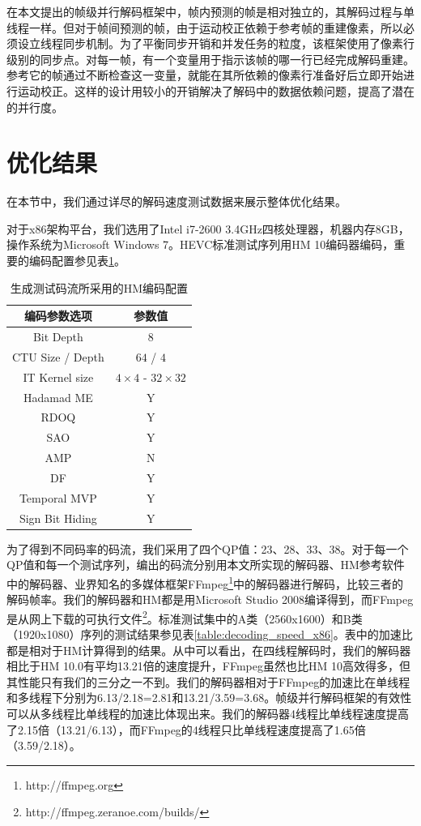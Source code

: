 在本文提出的帧级并行解码框架中，帧内预测的帧是相对独立的，其解码过程与单线程一样。但对于帧间预测的帧，由于运动校正依赖于参考帧的重建像素，所以必须设立线程同步机制。为了平衡同步开销和并发任务的粒度，该框架使用了像素行级别的同步点。对每一帧，有一个变量用于指示该帧的哪一行已经完成解码重建。参考它的帧通过不断检查这一变量，就能在其所依赖的像素行准备好后立即开始进行运动校正。这样的设计用较小的开销解决了解码中的数据依赖问题，提高了潜在的并行度。

\section{优化结果}

在本节中，我们通过详尽的解码速度测试数据来展示整体优化结果。

对于x86架构平台，我们选用了Intel i7-2600 3.4GHz四核处理器，机器内存8GB，操作系统为Microsoft Windows 7。HEVC标准测试序列用HM 10编码器编码，重要的编码配置参见表\ref{table:HM_config}。

\begin{table}[t]
	\begin{center}
		\caption{生成测试码流所采用的HM编码配置} \label{table:HM_config}
		\renewcommand{\arraystretch}{1.5}
		\begin{tabular}{c|c}
			\hline
			\textbf{编码参数选项} & \textbf{参数值} \\
			\hline
			\hline
			Bit Depth & $8$ \\
			\hline
			CTU Size / Depth & $64$ / $4$ \\
			\hline
			IT Kernel size & $4 \times 4$ - $32 \times 32$ \\
			\hline
			Hadamad ME & Y \\
			\hline
			RDOQ & Y \\
			\hline
			SAO & Y \\
			\hline
			AMP & N \\
			\hline
			DF & Y \\
			\hline
			Temporal MVP & Y \\
			\hline
			Sign Bit Hiding & Y \\
			\hline
		\end{tabular}
	\end{center}
\end{table}

为了得到不同码率的码流，我们采用了四个QP值：23、28、33、38。对于每一个QP值和每一个测试序列，编出的码流分别用本文所实现的解码器、HM参考软件中的解码器、业界知名的多媒体框架FFmpeg\footnote{http://ffmpeg.org}中的解码器进行解码，比较三者的解码帧率。我们的解码器和HM都是用Microsoft Studio 2008编译得到，而FFmpeg是从网上下载的可执行文件\footnote{http://ffmpeg.zeranoe.com/builds/}。标准测试集中的A类（2560x1600）和B类（1920x1080）序列的测试结果参见表\ref{table:decoding_speed_x86}。表中的加速比都是相对于HM计算得到的结果。从中可以看出，在四线程解码时，我们的解码器相比于HM 10.0有平均13.21倍的速度提升，FFmpeg虽然也比HM 10高效得多，但其性能只有我们的三分之一不到。我们的解码器相对于FFmpeg的加速比在单线程和多线程下分别为6.13/2.18=2.81和13.21/3.59=3.68。帧级并行解码框架的有效性可以从多线程比单线程的加速比体现出来。我们的解码器4线程比单线程速度提高了2.15倍（13.21/6.13），而FFmpeg的4线程只比单线程速度提高了1.65倍（3.59/2.18）。

